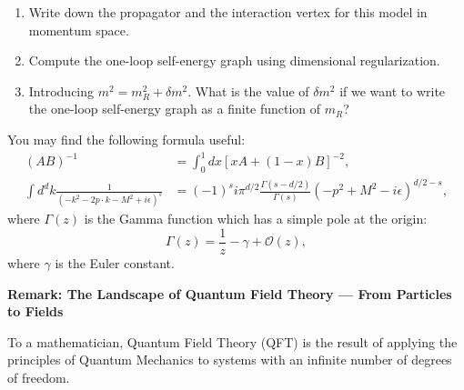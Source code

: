 \begin{exercise}
\begin{enumerate}[label=(\alph*)]
    \item Write down the propagator and the interaction vertex for this model in momentum space.
    \item Compute the one-loop self-energy graph using dimensional regularization.
    \item Introducing $m ^ { 2 } = m _ { R } ^ { 2 } + \delta m ^ { 2 }$. What is the value of $\delta m ^ { 2 }$ if we want to write the one-loop self-energy graph as a finite function of $m _ { R }$?
\end{enumerate}

You may find the following formula useful:
\begin{align}
    (A B) ^ {- 1} &= \int_ {0} ^ {1} d x [ x A + (1 - x) B ] ^ {- 2}, \label{eq:2023:6:12} \\
    \int d ^ {d} k \frac {1}{(- k ^ {2} - 2 p \cdot k - M ^ {2} + i \epsilon) ^ {s}} &= (- 1) ^ {s} i \pi^ {d / 2} \frac {\Gamma (s - d / 2)}{\Gamma (s)} (- p ^ {2} + M ^ {2} - i \epsilon) ^ {d / 2 - s}, \label{eq:2023:6:13}
\end{align}
where $\Gamma ( z )$ is the Gamma function which has a simple pole at the origin:
\begin{equation}
    \Gamma(z) = \frac{1}{z} - \gamma + \mathcal{O}(z), \label{eq:2023:6:14}
\end{equation}
where $\gamma$ is the Euler constant.
\end{exercise}

\textbf{Remark: The Landscape of Quantum Field Theory --- From Particles to Fields}

To a mathematician, Quantum Field Theory (QFT) is the result of applying the principles of Quantum Mechanics to systems with an infinite number of degrees of freedom.

